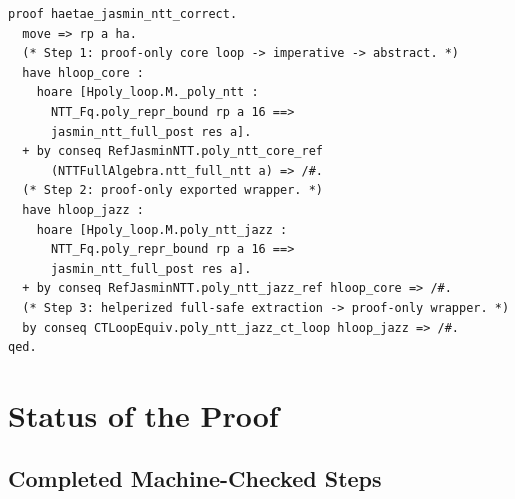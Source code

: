 \begin{lstlisting}[language=EasyCrypt,
  caption={Proof composition in \texttt{NTTEndToEnd.ec}},
  label={lst:e2e_proof}]
proof haetae_jasmin_ntt_correct.
  move => rp a ha.
  (* Step 1: proof-only core loop -> imperative -> abstract. *)
  have hloop_core :
    hoare [Hpoly_loop.M._poly_ntt :
      NTT_Fq.poly_repr_bound rp a 16 ==>
      jasmin_ntt_full_post res a].
  + by conseq RefJasminNTT.poly_ntt_core_ref
      (NTTFullAlgebra.ntt_full_ntt a) => /#.
  (* Step 2: proof-only exported wrapper. *)
  have hloop_jazz :
    hoare [Hpoly_loop.M.poly_ntt_jazz :
      NTT_Fq.poly_repr_bound rp a 16 ==>
      jasmin_ntt_full_post res a].
  + by conseq RefJasminNTT.poly_ntt_jazz_ref hloop_core => /#.
  (* Step 3: helperized full-safe extraction -> proof-only wrapper. *)
  by conseq CTLoopEquiv.poly_ntt_jazz_ct_loop hloop_jazz => /#.
qed.
\end{lstlisting}

\section{Status of the Proof}

\subsection{Completed Machine-Checked Steps}

